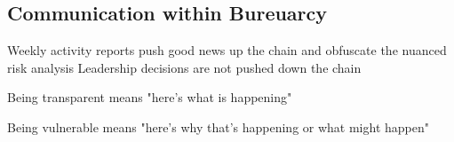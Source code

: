 \subsection{Communication within Bureuarcy}

Weekly activity reports push good news up the chain and obfuscate the nuanced risk analysis
Leadership decisions are not pushed down the chain


Being transparent means "here's what is happening"

Being vulnerable means "here's why that's happening or what might happen"